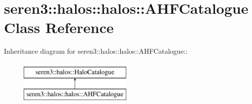 \hypertarget{classseren3_1_1halos_1_1halos_1_1AHFCatalogue}{
\section{seren3::halos::halos::AHFCatalogue Class Reference}
\label{classseren3_1_1halos_1_1halos_1_1AHFCatalogue}
}
Inheritance diagram for seren3::halos::halos::AHFCatalogue::\begin{figure}[H]
\begin{center}
\leavevmode
\includegraphics[height=2cm]{classseren3_1_1halos_1_1halos_1_1AHFCatalogue}
\end{center}
\end{figure}
